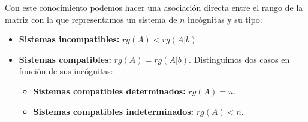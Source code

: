 Con este conocimiento podemos hacer una asociación directa entre el rango de la matriz con la que representamos un sistema de $n$ incógnitas y su tipo:

\begin{itemize}
	\item\textbf{Sistemas incompatibles:}
		$rg(A) < rg(A|b)$.
	\item\textbf{Sistemas compatibles:}
		$rg(A) = rg(A|b)$.
		Distinguimos dos casos en función de sus incógnitas:
		\begin{itemize}
			\item\textbf{Sistemas compatibles determinados:}
				$rg(A) = n$.
			\item\textbf{Sistemas compatibles indeterminados:}
				$rg(A) < n$.
		\end{itemize}
\end{itemize}
